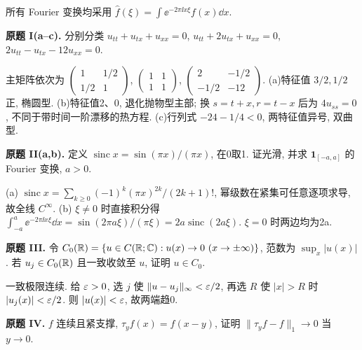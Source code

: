 所有 Fourier 变换均采用 $\widehat f(\xi)=\int\ee^{-2\pi\ii x\xi}f(x)\dd x$.
\begin{exercise}\label{ps:9I}
\textbf{原题 I(a--c).} 分别分类 $u_{tt}+u_{tx}+u_{xx}=0$, $u_{tt}+2u_{tx}+u_{xx}=0$, $2u_{tt}-u_{tx}-12u_{xx}=0$.
\end{exercise}
\begin{solution}
主矩阵依次为 $\left(\begin{smallmatrix}1&1/2\\1/2&1\end{smallmatrix}\right)$, $\left(\begin{smallmatrix}1&1\\1&1\end{smallmatrix}\right)$, $\left(\begin{smallmatrix}2&-1/2\\-1/2&-12\end{smallmatrix}\right)$. (a)特征值 $3/2,1/2$ 正, 椭圆型. (b)特征值2、0, 退化抛物型主部; 换 $s=t+x,r=t-x$ 后为 $4u_{ss}=0$, 不同于带时间一阶漂移的热方程. (c)行列式 $-24-1/4<0$, 两特征值异号, 双曲型.
\end{solution}
\begin{exercise}\label{ps:9II}
\textbf{原题 II(a,b).} 定义 $\operatorname{sinc}x=\sin(\pi x)/(\pi x)$, 在0取1. 证光滑, 并求 $\mathbf1_{[-a,a]}$ 的 Fourier 变换, $a>0$.
\end{exercise}
\begin{solution}
(a) $\operatorname{sinc}x=\sum_{k\ge0}(-1)^k(\pi x)^{2k}/(2k+1)!$, 幂级数在紧集可任意逐项求导, 故全线 $C^\infty$.
(b) $\xi\ne0$ 时直接积分得 $\int_{-a}^a\ee^{-2\pi\ii x\xi}\dd x=\sin(2\pi a\xi)/(\pi\xi)=2a\operatorname{sinc}(2a\xi)$. $\xi=0$ 时两边均为2a.
\end{solution}
\begin{exercise}\label{ps:9III}
\textbf{原题 III.} 令 $C_0(\R)=\{u\in C(\R;\C):u(x)\to0\ (x\to\pm\infty)\}$, 范数为 $\sup_x|u(x)|$. 若 $u_j\in C_0(\mathbb R)$ 且一致收敛至 $u$, 证明 $u\in C_0$.
\end{exercise}
\begin{solution}
一致极限连续. 给 $\varepsilon>0$, 选 $j$ 使 $\|u-u_j\|_\infty<\varepsilon/2$, 再选 $R$ 使 $|x|>R$ 时 $|u_j(x)|<\varepsilon/2$. 则 $|u(x)|<\varepsilon$, 故两端趋0.
\end{solution}
\begin{exercise}\label{ps:9IV}
\textbf{原题 IV.} $f$ 连续且紧支撑, $\tau_yf(x)=f(x-y)$, 证明 $\|\tau_yf-f\|_1\to0$ 当 $y\to0$.
\end{exercise}
